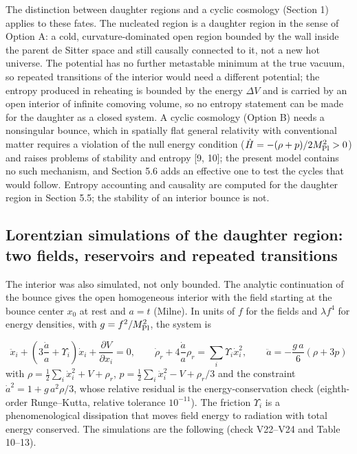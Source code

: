 \documentclass[11pt,a4paper]{article}
\begin{document}
The distinction between daughter regions and a cyclic cosmology (Section 1) applies to these fates. The nucleated region is a daughter region in the sense of Option A: a cold, curvature-dominated open region bounded by the wall inside the parent de Sitter space and still causally connected to it, not a new hot universe. The potential has no further metastable minimum at the true vacuum, so repeated transitions of the interior would need a different potential; the entropy produced in reheating is bounded by the energy $\Delta V$ and is carried by an open interior of infinite comoving volume, so no entropy statement can be made for the daughter as a closed system. A cyclic cosmology (Option B) needs a nonsingular bounce, which in spatially flat general relativity with conventional matter requires a violation of the null energy condition ($\dot H=-(\rho+p)/2M_{\rm Pl}^2>0$) and raises problems of stability and entropy [9, 10]; the present model contains no such mechanism, and Section 5.6 adds an effective one to test the cycles that would follow. Entropy accounting and causality are computed for the daughter region in Section 5.5; the stability of an interior bounce is not.

\subsection{Lorentzian simulations of the daughter region: two fields, reservoirs and repeated transitions}
The interior was also simulated, not only bounded. The analytic continuation of the bounce gives the open homogeneous interior with the field starting at the bounce center $x_0$ at rest and $a=t$ (Milne). In units of $f$ for the fields and $\lambda f^4$ for energy densities, with $g=f^2/M_{\rm Pl}^2$, the system is

\begin{equation}
\ddot x_i+\left(3\frac{\dot a}{a}+\Upsilon_i\right)\dot x_i+\frac{\partial V}{\partial x_i}=0,\qquad \dot\rho_r+4\frac{\dot a}{a}\rho_r=\sum_i\Upsilon_i\dot x_i^2,\qquad \ddot a=-\frac{g\,a}{6}(\rho+3p)
\end{equation}
with $\rho=\tfrac12\sum_i\dot x_i^2+V+\rho_r$, $p=\tfrac12\sum_i\dot x_i^2-V+\rho_r/3$ and the constraint $\dot a^2=1+g\,a^2\rho/3$, whose relative residual is the energy-conservation check (eighth-order Runge--Kutta, relative tolerance $10^{-11}$). The friction $\Upsilon_i$ is a phenomenological dissipation that moves field energy to radiation with total energy conserved. The simulations are the following (check V22--V24 and Table 10--13).
\end{document}
